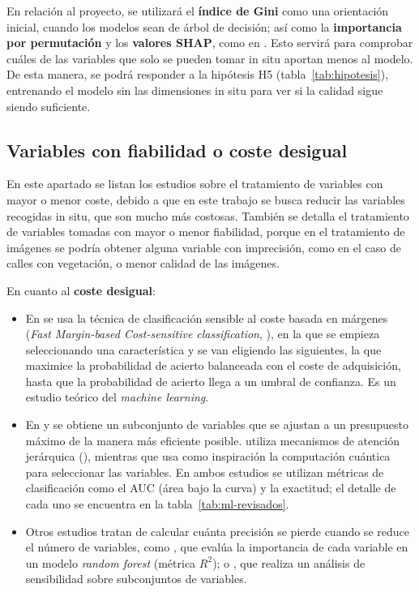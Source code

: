 En relación al proyecto, se utilizará el \textbf{índice de Gini} como una orientación inicial, cuando los modelos sean de árbol de decisión; así como la \textbf{importancia por permutación} y los \textbf{valores SHAP}, como en \textcite{agal2026}. Esto servirá para comprobar cuáles de las variables que solo se pueden tomar in situ aportan menos al modelo.
De esta manera, se podrá responder a la hipótesis H5 (tabla~\ref{tab:hipotesis}), entrenando el modelo sin las dimensiones in situ para ver si la calidad sigue siendo suficiente.
\\

\subsection{Variables con fiabilidad o coste desigual}
\label{subsec:ml-fiabilidad}

En este apartado se listan los estudios sobre el tratamiento de variables con mayor o menor coste, debido a que en este trabajo se busca reducir las variables recogidas in situ, que son mucho más costosas. También se detalla el tratamiento de variables tomadas con mayor o menor fiabilidad, porque en el tratamiento de imágenes se podría obtener alguna variable con imprecisión, como en el caso de calles con vegetación, o menor calidad de las imágenes.

\noindent En cuanto al \textbf{coste desigual}:
\begin{itemize}
  \item En \textcite{nan2014} se usa la técnica de clasificación sensible al coste basada en márgenes (\textit{Fast Margin-based Cost-sensitive classification}, \textbf{}), en la que se empieza seleccionando una característica y se van eligiendo las siguientes, la que maximice la probabilidad de acierto balanceada con el coste de adquisición, hasta que la probabilidad de acierto llega a un umbral de confianza. Es un estudio teórico del \textit{machine learning}.
  \item En \textcite{chen2024cost} y \textcite{liu2024haff} se obtiene un subconjunto de variables que se ajustan a un presupuesto máximo de la manera más eficiente posible. \textcite{liu2024haff} utiliza mecanismos de atención jerárquica (\textbf{}), mientras que \textcite{chen2024cost} usa como inspiración la computación cuántica para seleccionar las variables. En ambos estudios se utilizan métricas de clasificación como el AUC (área bajo la curva) y la exactitud; el detalle de cada uno se encuentra en la tabla~\ref{tab:ml-revisados}.
  \item Otros estudios tratan de calcular cuánta precisión se pierde cuando se reduce el número de variables, como \textcite{mohite2024}, que evalúa la importancia de cada variable en un modelo \textit{random forest} (métrica $R^2$); o \textcite{wu2026}, que realiza un análisis de sensibilidad sobre subconjuntos de variables.
\end{itemize}

